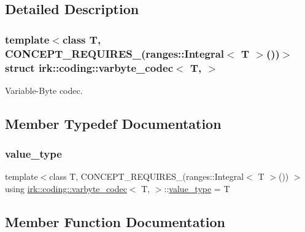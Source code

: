 \subsection{Detailed Description}
\subsubsection*{template$<$class T, C\+O\+N\+C\+E\+P\+T\+\_\+\+R\+E\+Q\+U\+I\+R\+E\+S\+\_\+(ranges\+::\+Integral$<$ T $>$())$>$\newline
struct irk\+::coding\+::varbyte\+\_\+codec$<$ T, $>$}

Variable-\/\+Byte codec. 

\subsection{Member Typedef Documentation}
\mbox{\label{structirk_1_1coding_1_1varbyte__codec_addad40df722d08275853597cbe8e178b}} 
\subsubsection{\texorpdfstring{value\+\_\+type}{value\_type}}
{\footnotesize\ttfamily template$<$class T, C\+O\+N\+C\+E\+P\+T\+\_\+\+R\+E\+Q\+U\+I\+R\+E\+S\+\_\+(ranges\+::\+Integral$<$ T $>$()) $>$ \\
using \mbox{\hyperlink{structirk_1_1coding_1_1varbyte__codec}{irk\+::coding\+::varbyte\+\_\+codec}}$<$ T, $>$\+::\mbox{\hyperlink{structirk_1_1coding_1_1varbyte__codec_addad40df722d08275853597cbe8e178b}{value\+\_\+type}} =  T}



\subsection{Member Function Documentation}
\mbox{\label{structirk_1_1coding_1_1varbyte__codec_a97cd396398669567fbfca7e6d1f6468a}} 
